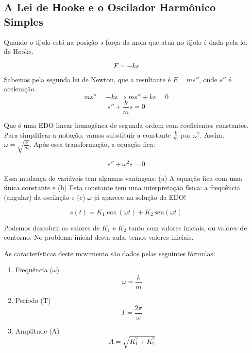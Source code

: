 \documentclass[a4paper]{article}
\providecommand{\sin}{} \renewcommand{\sin}{\hspace{2pt}\mathrm{sen}}
\begin{document}
\subsection{A Lei de Hooke e o Oscilador Harmônico Simples}

Quando o tijolo está na posição $s$ força da mola que atua no tijolo é
dada pela lei de Hooke.

\begin{displaymath}
  F = -ks
\end{displaymath}

Sabemos pela segunda lei de Newton, que a resultante é $F=m s''$, onde
$s''$ é aceleração.
\begin{displaymath}
  ms'' = -ks \Rightarrow ms'' +ks =0
\end{displaymath}
\begin{displaymath}
  s''+\frac{k}{m}s=0
\end{displaymath}

Que é uma EDO linear homogênea de segunda ordem com coeficientes
constantes. Para simplificar a notação, vamos substituir a constante
$\frac{k}{m}$ por $\omega^2$. Assim, $\omega=\sqrt{\frac{k}{m}}$. Após
essa transformação, a equação fica:

\begin{displaymath}
  s''+\omega^2s=0
\end{displaymath}

Essa mudança de variáveis tem algumas vantagens: (a) A equação fica
com uma única constante e (b) Esta constante tem uma interpretação
física: a frequência (angular) da oscilação e (c) $\omega$ já aparece
na solução da EDO!

\begin{displaymath}
  s(t) = K_1 \cos(\omega t) + K_2 \sin(\omega t)
\end{displaymath}

Podemos descobrir os valores de $K_1$ e $K_2$ tanto com valores
iniciais, ou valores de contorno. No problema inicial desta aula,
temos valores iniciais.

As características deste movimento são dados pelas seguintes fórmulas:

\begin{enumerate}
\item Frequência ($\omega$)
\begin{displaymath}
  \omega = \frac{k}{m}
\end{displaymath}
\item Período (T)
\begin{displaymath}
  T= \frac{2\pi}{\omega}
\end{displaymath}
\item Amplitude (A)
\begin{displaymath}
  A = \sqrt{K_1^2 + K_2^2}
\end{displaymath}
\end{enumerate}
\end{document}
